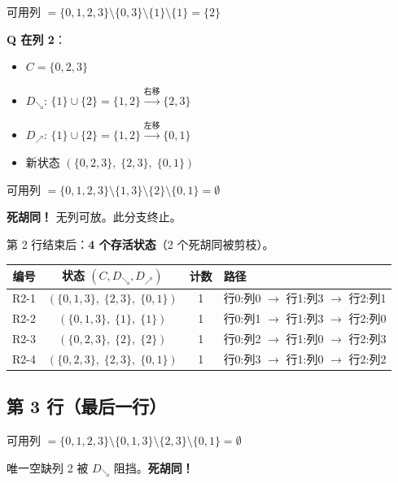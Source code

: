 \documentclass[12pt,a4paper]{article}
\begin{document}
\begin{stepbox}[状态 5: $(\{0,3\},\;\{1\},\;\{1\})$ --- 来自 S4$\to$列0]
可用列 $= \{0,1,2,3\} \setminus \{0,3\} \setminus \{1\} \setminus \{1\} = \{2\}$

\textbf{Q 在列 2}：
\begin{itemize}[nosep]
  \item $C = \{0,2,3\}$
  \item $D_\searrow$: $\{1\} \cup \{2\} = \{1,2\} \xrightarrow{\text{右移}} \{2,3\}$
  \item $D_\nearrow$: $\{1\} \cup \{2\} = \{1,2\} \xrightarrow{\text{左移}} \{0,1\}$
  \item 新状态 $(\{0,2,3\},\;\{2,3\},\;\{0,1\})$
\end{itemize}
\end{stepbox}

\begin{stepbox}[状态 6: $(\{1,3\},\;\{2\},\;\{0,1\})$ --- 来自 S4$\to$列1]
可用列 $= \{0,1,2,3\} \setminus \{1,3\} \setminus \{2\} \setminus \{0,1\} = \emptyset$

\textcolor{myred}{\textbf{死胡同！}} 无列可放。此分支终止。
\end{stepbox}

第 2 行结束后：\textbf{4 个存活状态}（2 个死胡同被剪枝）。

\begin{center}
\renewcommand{\arraystretch}{1.3}
\begin{tabular}{c|c|c|l}
\toprule
编号 & 状态 $(C, D_\searrow, D_\nearrow)$ & 计数 & 路径 \\
\midrule
R2-1 & $(\{0,1,3\},\;\{2,3\},\;\{0,1\})$ & 1 & 行0:列0 $\to$ 行1:列3 $\to$ 行2:列1 \\
R2-2 & $(\{0,1,3\},\;\{1\},\;\{1\})$ & 1 & 行0:列1 $\to$ 行1:列3 $\to$ 行2:列0 \\
R2-3 & $(\{0,2,3\},\;\{2\},\;\{2\})$ & 1 & 行0:列2 $\to$ 行1:列0 $\to$ 行2:列3 \\
R2-4 & $(\{0,2,3\},\;\{2,3\},\;\{0,1\})$ & 1 & 行0:列3 $\to$ 行1:列0 $\to$ 行2:列2 \\
\bottomrule
\end{tabular}
\end{center}

\subsection{第 3 行（最后一行）}

\begin{stepbox}[R2-1: $(\{0,1,3\},\;\{2,3\},\;\{0,1\})$]
可用列 $= \{0,1,2,3\} \setminus \{0,1,3\} \setminus \{2,3\} \setminus \{0,1\} = \emptyset$

唯一空缺列 2 被 $D_\searrow$ 阻挡。\textcolor{myred}{\textbf{死胡同！}}
\end{stepbox}
\end{document}
